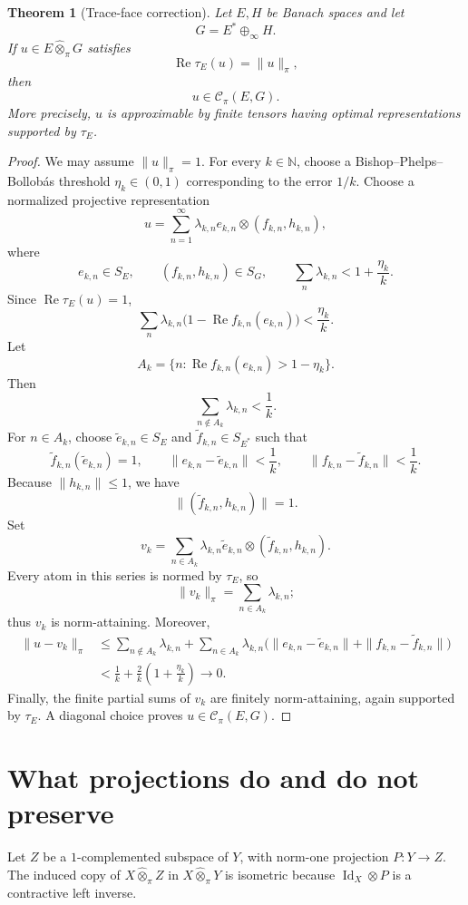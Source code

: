 \documentclass[11pt]{article}
\newtheorem{theorem}{Theorem}[section]
\theoremstyle{definition}
\theoremstyle{remark}
\newcommand{\N}{\mathbb N}
\newcommand{\whot}{\widehat\otimes_\pi}
\newcommand{\Rea}{\operatorname{Re}}
\newcommand{\id}{\operatorname{Id}}
\newcommand{\Cpi}{\mathscr C_\pi}
\begin{document}
\begin{theorem}[Trace-face correction]\label{thm:trace}
Let $E,H$ be Banach spaces and let
\[
 G=E^*\oplus_\infty H.
\]
If $u\in E\whot G$ satisfies
\[
 \Rea\tau_E(u)=\|u\|_\pi,
\]
then
\[
 u\in\Cpi(E,G).
\]
More precisely, $u$ is approximable by finite tensors having optimal representations supported by $\tau_E$.
\end{theorem}

\begin{proof}
We may assume $\|u\|_\pi=1$.  For every $k\in\N$, choose a Bishop--Phelps--Bollob\'as threshold $\eta_k\in(0,1)$ corresponding to the error $1/k$.  Choose a normalized projective representation
\[
 u=\sum_{n=1}^\infty\lambda_{k,n}e_{k,n}\otimes(f_{k,n},h_{k,n}),
\]
where
\[
 e_{k,n}\in S_E,
 \qquad
 (f_{k,n},h_{k,n})\in S_G,
 \qquad
 \sum_n\lambda_{k,n}<1+\frac{\eta_k}{k}.
\]
Since $\Rea\tau_E(u)=1$,
\[
 \sum_n\lambda_{k,n}
 \bigl(1-\Rea f_{k,n}(e_{k,n})\bigr)
 <\frac{\eta_k}{k}.
\]
Let
\[
 A_k=\{n:\Rea f_{k,n}(e_{k,n})>1-\eta_k\}.
\]
Then
\[
 \sum_{n\notin A_k}\lambda_{k,n}<\frac1k.
\]
For $n\in A_k$, choose $\widetilde e_{k,n}\in S_E$ and $\widetilde f_{k,n}\in S_{E^*}$ such that
\[
 \widetilde f_{k,n}(\widetilde e_{k,n})=1,
 \qquad
 \|e_{k,n}-\widetilde e_{k,n}\|<\frac1k,
 \qquad
 \|f_{k,n}-\widetilde f_{k,n}\|<\frac1k.
\]
Because $\|h_{k,n}\|\leq1$, we have
\[
 \|(\widetilde f_{k,n},h_{k,n})\|=1.
\]
Set
\[
 v_k=\sum_{n\in A_k}\lambda_{k,n}
 \widetilde e_{k,n}\otimes(\widetilde f_{k,n},h_{k,n}).
\]
Every atom in this series is normed by $\tau_E$, so
\[
 \|v_k\|_\pi=\sum_{n\in A_k}\lambda_{k,n};
\]
thus $v_k$ is norm-attaining.  Moreover,
\begin{align*}
 \|u-v_k\|_\pi
 &\leq \sum_{n\notin A_k}\lambda_{k,n}
 +\sum_{n\in A_k}\lambda_{k,n}
 \bigl(\|e_{k,n}-\widetilde e_{k,n}\|
       +\|f_{k,n}-\widetilde f_{k,n}\|\bigr)\\
 &<\frac1k+\frac{2}{k}\left(1+\frac{\eta_k}{k}\right)
 \longrightarrow0.
\end{align*}
Finally, the finite partial sums of $v_k$ are finitely norm-attaining, again supported by $\tau_E$.  A diagonal choice proves $u\in\Cpi(E,G)$.
\end{proof}

\section{What projections do and do not preserve}

Let $Z$ be a $1$-complemented subspace of $Y$, with norm-one projection $P:Y\to Z$.  The induced copy of $X\whot Z$ in $X\whot Y$ is isometric because $\id_X\otimes P$ is a contractive left inverse.
\end{document}
